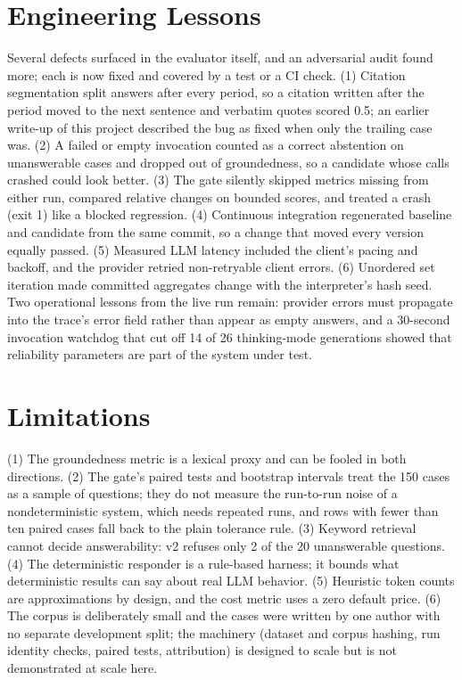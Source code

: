 \documentclass[conference]{IEEEtran}
\begin{document}
\section{Engineering Lessons}
Several defects surfaced in the evaluator itself, and an adversarial audit
found more; each is now fixed and covered by a test or a CI check. (1) Citation segmentation split
answers after every period, so a citation written after the period moved
to the next sentence and verbatim quotes scored 0.5; an earlier write-up of
this project described the bug as fixed when only the trailing case was.
(2) A failed or empty invocation counted as a correct abstention on
unanswerable cases and dropped out of groundedness, so a candidate whose
calls crashed could look better. (3) The gate silently skipped metrics
missing from either run, compared relative changes on bounded scores, and
treated a crash (exit 1) like a blocked regression. (4) Continuous
integration regenerated baseline and candidate from the same commit, so a
change that moved every version equally passed. (5) Measured LLM latency
included the client's pacing and backoff, and the provider retried
non-retryable client errors. (6) Unordered set iteration made committed
aggregates change with the interpreter's hash seed. Two operational lessons
from the live run remain: provider errors must propagate into the trace's
error field rather than appear as empty answers, and a 30-second invocation
watchdog that cut off 14 of 26 thinking-mode generations showed that
reliability parameters are part of the system under test.

\section{Limitations}
(1) The groundedness metric is a lexical proxy and can be fooled in both
directions. (2) The gate's paired tests and bootstrap intervals treat the
150 cases as a sample of questions; they do not measure the run-to-run
noise of a nondeterministic system, which needs repeated runs, and rows
with fewer than ten paired cases fall back to the plain tolerance rule.
(3) Keyword retrieval cannot decide answerability: v2 refuses only 2 of the
20 unanswerable questions. (4) The deterministic
responder is a rule-based harness; it bounds what deterministic results can
say about real LLM behavior. (5) Heuristic token counts are approximations
by design, and the cost metric uses a zero default price. (6) The corpus
is deliberately small and the cases were written by one author with no
separate development split; the machinery (dataset and corpus hashing, run
identity checks, paired tests, attribution) is designed to scale but is not
demonstrated at scale here.
\end{document}
